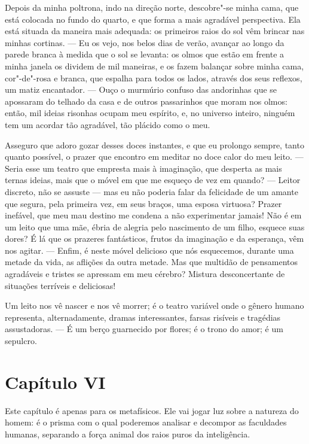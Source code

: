  Depois da minha poltrona, indo na direção norte, descobre"-se minha
cama, que está colocada no fundo do quarto, e que forma a mais
agradável perspectiva. Ela está situada da maneira mais adequada: os
primeiros raios do sol vêm brincar nas minhas cortinas. --- Eu os vejo,
nos belos dias de verão, avançar ao longo da parede branca à medida que
o sol se levanta: os olmos que estão em frente a minha janela os
dividem de mil maneiras, e os fazem balançar sobre minha cama,
cor"-de"-rosa e branca, que espalha para todos os lados, através dos seus
reflexos, um matiz encantador. --- Ouço o murmúrio confuso das
andorinhas que se apossaram do telhado da casa e de outros passarinhos
que moram nos olmos: então, mil ideias risonhas ocupam meu espírito, e,
no universo inteiro, ninguém tem um acordar tão agradável, tão plácido
como o meu.

 Asseguro que adoro gozar desses doces instantes, e que eu prolongo
sempre, tanto quanto possível, o prazer que encontro em meditar no doce
calor do meu leito. --- Seria esse um teatro que empresta mais à
imaginação, que desperta as mais ternas ideias, mais que o móvel em que
me esqueço de vez em quando? --- Leitor discreto, não se assuste ---
mas eu não poderia falar da felicidade de um amante que segura, pela
primeira vez, em seus braços, uma esposa virtuosa? Prazer inefável, que
meu mau destino me condena a não experimentar jamais! Não é em um leito
que uma mãe, ébria de alegria pelo nascimento de um filho, esquece suas
dores? É lá que os prazeres fantásticos, frutos da imaginação e da
esperança, vêm nos agitar. --- Enfim, é neste móvel delicioso que nós
esquecemos, durante uma metade da vida, as aflições da outra metade.
Mas que multidão de pensamentos agradáveis e tristes se apressam em meu
cérebro? Mistura desconcertante de situações terríveis e deliciosas!

 Um leito nos vê nascer e nos vê morrer; é o teatro variável onde o
gênero humano representa, alternadamente, dramas interessantes, farsas
risíveis e tragédias assustadoras. --- É um berço guarnecido por
flores; é o trono do amor; é um sepulcro.

\section*{Capítulo VI}

 Este capítulo é apenas para os metafísicos. Ele vai jogar luz sobre a
natureza do homem: é o prisma com o qual poderemos analisar e decompor
as faculdades humanas, separando a força animal dos raios puros da
inteligência. 


